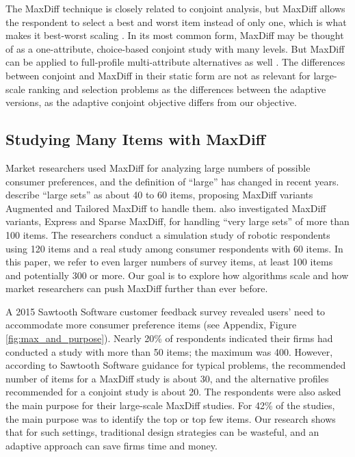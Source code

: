 \documentclass[nonblindrev]{informs3}
\begin{document}
The MaxDiff technique is closely related to conjoint analysis, but MaxDiff allows the respondent to select a best and worst item instead of only one, which is what makes it best-worst scaling \citep{marley2005some}. In its most common form, MaxDiff may be thought of as a one-attribute, choice-based conjoint study with many levels. But MaxDiff can be applied to full-profile multi-attribute alternatives as well \citep{marley2012models}. The differences between conjoint and MaxDiff in their static form are not as relevant for large-scale ranking and selection problems as the differences between the adaptive versions, as the adaptive conjoint objective differs from our objective.

\subsection{Studying Many Items with MaxDiff}

Market researchers used MaxDiff for analyzing large numbers of possible consumer preferences, and the definition of ``large'' has changed in recent years. \cite{hendrix2007alternative} describe ``large sets'' as about 40 to 60 items, proposing MaxDiff variants Augmented and Tailored MaxDiff to handle them. \cite{wirth2012largeset} also investigated MaxDiff variants, Express and Sparse MaxDiff, for handling ``very large sets'' of more than 100 items. The researchers conduct a simulation study of robotic respondents using 120 items and a real study among consumer respondents with 60 items. In this paper, we refer to even larger numbers of survey items, at least 100 items and potentially 300 or more. Our goal is to explore how algorithms scale and how market researchers can push MaxDiff further than ever before.

A 2015 Sawtooth Software customer feedback survey revealed users' need to accommodate more consumer preference items (see Appendix, Figure \ref{fig:max_and_purpose}). Nearly 20\% of respondents indicated their firms had conducted a study with more than 50 items; the maximum was 400. However, according to Sawtooth Software guidance for typical problems, the recommended number of items for a MaxDiff study is about 30, and the alternative profiles recommended for a conjoint study is about 20. The respondents were also asked the main purpose for their large-scale MaxDiff studies. For 42\% of the studies, the main purpose was to identify the top or top few items. Our research shows that for such settings, traditional design strategies can be wasteful, and an adaptive approach can save firms time and money.
\end{document}
